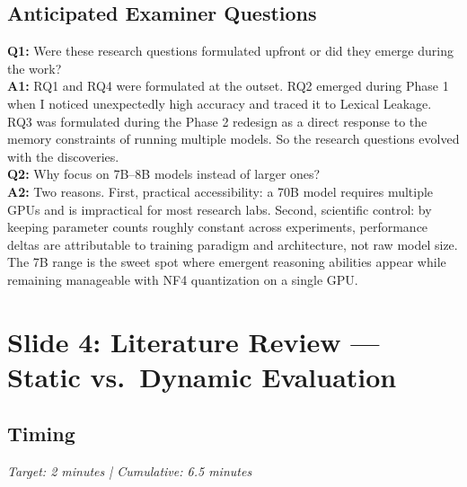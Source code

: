 \documentclass[12pt]{article}
\begin{document}
  \subsection*{Anticipated Examiner Questions}
  \begin{qabox}
  \textbf{Q1:} Were these research questions formulated upfront or did they emerge during the work? \\
  \textbf{A1:} RQ1 and RQ4 were formulated at the outset. RQ2 emerged during Phase 1 when I noticed unexpectedly high accuracy and traced it to Lexical Leakage. RQ3 was formulated during the Phase 2 redesign as a direct response to the memory constraints of running multiple models. So the research questions evolved with the discoveries. \\[6pt]
  \textbf{Q2:} Why focus on 7B--8B models instead of larger ones? \\
  \textbf{A2:} Two reasons. First, practical accessibility: a 70B model requires multiple GPUs and is impractical for most research labs. Second, scientific control: by keeping parameter counts roughly constant across experiments, performance deltas are attributable to training paradigm and architecture, not raw model size. The 7B range is the sweet spot where emergent reasoning abilities appear while remaining manageable with NF4 quantization on a single GPU.
  \end{qabox}



  \section{Slide 4: Literature Review --- Static vs.\ Dynamic Evaluation}

  \subsection*{Timing}
  \textit{Target: 2 minutes | Cumulative: 6.5 minutes}
\end{document}
